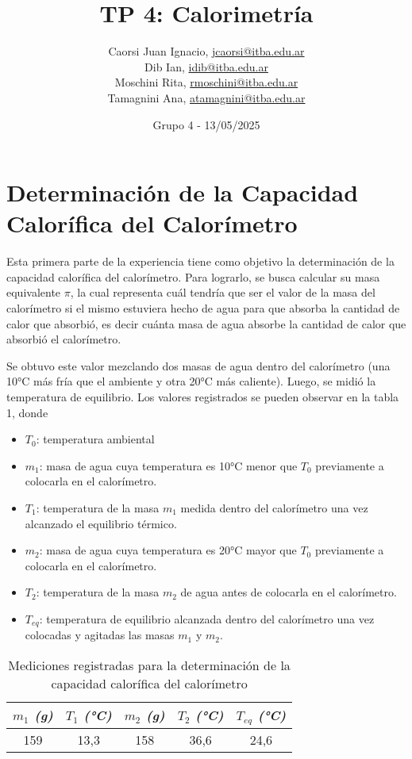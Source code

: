 \documentclass[12pt, a4paper]{article}
\title{TP 4: Calorimetría}
\author
{
  Caorsi Juan Ignacio, \href{jcaorsi@itba.edu.ar}{jcaorsi@itba.edu.ar} \\
  Dib Ian, \href{idib@itba.edu.ar}{idib@itba.edu.ar} \\
  Moschini Rita, \href{rmoschini@itba.edu.ar}{rmoschini@itba.edu.ar} \\
  Tamagnini Ana, \href{atamagnini@itba.edu.ar}{atamagnini@itba.edu.ar}
}
\date{Grupo 4 - 13/05/2025}
\begin{document}
\maketitle


\section{Determinación de la Capacidad Calorífica del Calorímetro}
Esta primera parte de la experiencia tiene como objetivo la determinación de la capacidad calorífica del calorímetro. Para lograrlo, se busca calcular su masa equivalente $\pi$, la cual representa cuál tendría que ser el valor de la masa del calorímetro si el mismo estuviera hecho de agua para que absorba la cantidad de calor que absorbió, es decir cuánta masa de agua absorbe la cantidad de calor que absorbió el calorímetro.
\par Se obtuvo este valor mezclando dos masas de agua dentro del calorímetro (una 10°C más fría que el ambiente y otra 20°C más caliente). Luego, se midió la temperatura de equilibrio. Los valores registrados se pueden observar en la tabla 1, donde
\begin{itemize}
    \item $T_0$: temperatura ambiental
    \item $m_1$: masa de agua cuya temperatura es 10°C menor que $T_0$ previamente a colocarla en el calorímetro.
    \item $T_1$: temperatura de la masa $m_1$ medida dentro del calorímetro una vez alcanzado el equilibrio térmico.
    \item $m_2$: masa de agua cuya temperatura es 20°C mayor que $T_0$ previamente a colocarla en el calorímetro.
    \item $T_2$: temperatura de la masa $m_2$ de agua antes de colocarla en el calorímetro.
    \item $T_{eq}$: temperatura de equilibrio alcanzada dentro del calorímetro una vez colocadas y agitadas las masas $m_1$ y $m_2$.
\end{itemize}

\begin{table}[h!]
\centering
\begin{tabular}{|c|c|c|c|c|}
\hline
\textit{$m_1$ (g)} & \textit{$T_1$ (°C)} & \textit{$m_2$ (g)} & \textit{$T_2$ (°C)} & \textit{$T_{eq}$ (°C)} \\
\hline
159 & 13,3 & 158 & 36,6 & 24,6 \\
\hline
\end{tabular}
\caption{Mediciones registradas para la determinación de la capacidad calorífica del calorímetro}
\end{table}
\end{document}
